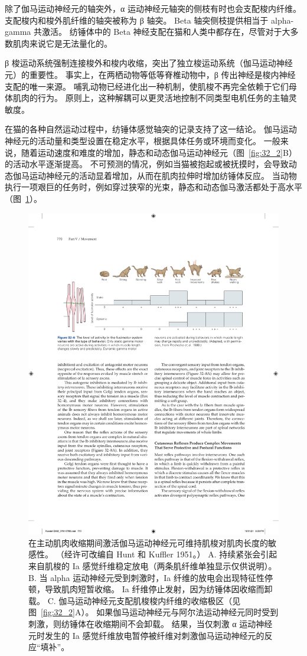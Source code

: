 除了伽马运动神经元的轴突外，α 运动神经元轴突的侧枝有时也会支配梭内纤维。
支配梭内和梭外肌纤维的轴突被称为 β 轴突。
Beta 轴突侧枝提供相当于 alpha-gamma 共激活。
纺锤体中的 Beta 神经支配在猫和人类中都存在，尽管对于大多数肌肉来说它是无法量化的。


β 梭运动系统强制连接梭外和梭内收缩，突出了独立梭运动系统（伽马运动神经元）的重要性。
事实上，在两栖动物等低等脊椎动物中，β 传出神经是梭内神经支配的唯一来源。
哺乳动物已经进化出一种机制，使肌梭不再完全依赖于它们母体肌肉的行为。
原则上，这种解耦可以更灵活地控制不同类型电机任务的主轴灵敏度。


在猫的各种自然运动过程中，纺锤体感觉轴突的记录支持了这一结论。
伽马运动神经元的活动量和类型设置在稳定水平，根据具体任务或环境而变化。
一般来说，随着运动速度和难度的增加，静态和动态伽马运动神经元（图~\ref{fig:32_2}B）的活动水平逐渐提高。
不可预测的情况，例如当猫被抱起或被抚摸时，会导致动态伽马运动神经元的活动显着增加，从而在肌肉拉伸时增加纺锤体反应。 
当动物执行一项艰巨的任务时，例如穿过狭窄的光束，静态和动态伽马激活都处于高水平（图~\ref{fig:32_6}）。


\begin{figure}[htbp]
	\centering
	\includegraphics[width=0.9\linewidth]{chap32/fig_32_6}
	\caption{在主动肌肉收缩期间激活伽马运动神经元可维持肌梭对肌肉长度的敏感性。 
	（经许可改编自 Hunt 和 Kuffler 1951。） 
	A. 持续紧张会引起来自肌梭的 Ia 感觉纤维稳定放电（两条肌纤维单独显示仅供说明）。
	B. 当 alpha 运动神经元受到刺激时，Ia 纤维的放电会出现特征性停顿，导致肌肉短暂收缩。 Ia 纤维停止发射，因为纺锤体因收缩而卸载。
	C. 伽马运动神经元支配肌梭梭内纤维的收缩极区（见图~\ref{fig:32_2}A）。
	如果伽马运动神经元与阿尔法运动神经元同时受到刺激，则纺锤体在收缩期间不会卸载。
	结果，当仅刺激 α 运动神经元时发生的 Ia 感觉纤维放电暂停被纤维对刺激伽马运动神经元的反应“填补”。}
	\label{fig:32_6}
\end{figure}


